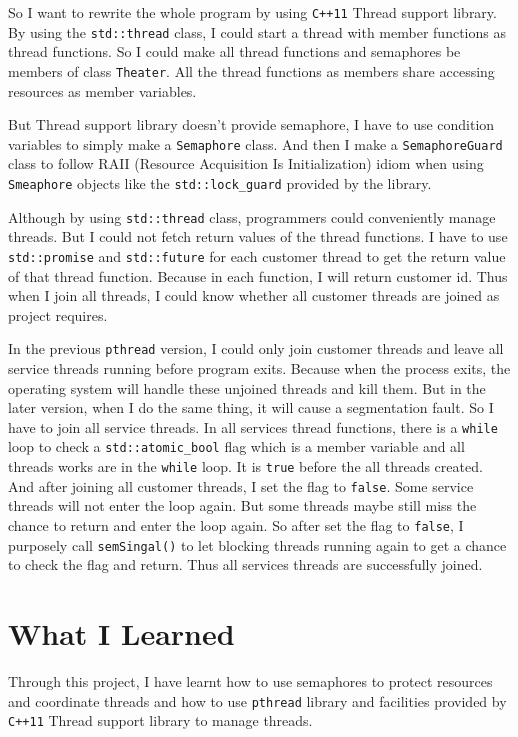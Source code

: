 \documentclass[a4paper]{report}
\begin{document}
So I want to rewrite the whole program by using \lstinline{C++11} Thread support library. By using the \lstinline{std::thread} class, I could start a thread with member functions as thread functions. So I could make all thread functions and semaphores be members of class \lstinline{Theater}. All the thread functions as members share accessing resources as member variables.

But Thread support library doesn't provide semaphore, I have to use condition variables to simply make a \lstinline{Semaphore} class. And then I make a \lstinline{SemaphoreGuard} class to follow RAII (Resource Acquisition Is Initialization) idiom when using \lstinline{Smeaphore} objects like the \lstinline{std::lock_guard} provided by the library.

Although by using \lstinline{std::thread} class, programmers could conveniently manage threads. But I could not fetch return values of the thread functions. I have to use \lstinline{std::promise} and \lstinline{std::future} for each customer thread to get the return value of that thread function. Because in each function, I will return customer id. Thus when I join all threads, I could know whether all customer threads are joined as project requires.

In the previous \lstinline{pthread} version, I could only join customer threads and leave all service threads running before program exits. Because when the process exits, the operating system will handle these unjoined threads and kill them. But in the later version, when I do the same thing, it will cause a segmentation fault. So I have to join all service threads. In all services thread functions, there is a \lstinline{while} loop to check a \lstinline{std::atomic_bool} flag which is a member variable and all threads works are in the \lstinline{while} loop. It is \lstinline{true} before the all threads created. And after joining all customer threads, I set the flag to \lstinline{false}. Some service threads will not enter the loop again. But some threads maybe still miss the chance to return and enter the loop again. So after set the flag to \lstinline{false}, I purposely call \lstinline{semSingal()} to let blocking threads running again to get a chance to check the flag and return. Thus all services threads are successfully joined.

\section*{What I Learned}
Through this project, I have learnt how to use semaphores to protect resources and coordinate threads and how to use \lstinline{pthread} library and facilities provided by \lstinline{C++11} Thread support library to manage threads.
\end{document}
